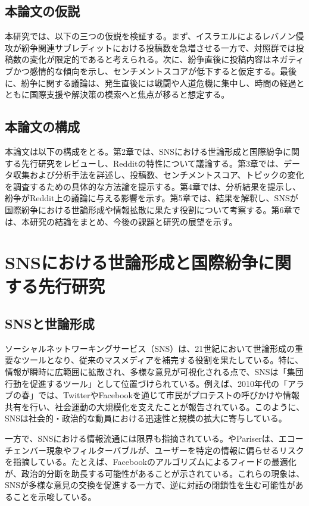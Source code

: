 \documentclass[11pt, a4j]{jreport}
\begin{document}
    \section{本論文の仮説}
    本研究では、以下の三つの仮説を検証する。まず、イスラエルによるレバノン侵攻が紛争関連サブレディットにおける投稿数を急増させる一方で、対照群では投稿数の変化が限定的であると考えられる。次に、紛争直後に投稿内容はネガティブかつ感情的な傾向を示し、センチメントスコアが低下すると仮定する。最後に、紛争に関する議論は、発生直後には戦闘や人道危機に集中し、時間の経過とともに国際支援や解決策の模索へと焦点が移ると想定する。
    
    \section{本論文の構成}
    本論文は以下の構成をとる。第2章では、SNSにおける世論形成と国際紛争に関する先行研究をレビューし、Redditの特性について議論する。第3章では、データ収集および分析手法を詳述し、投稿数、センチメントスコア、トピックの変化を調査するための具体的な方法論を提示する。第4章では、分析結果を提示し、紛争がReddit上の議論に与える影響を示す。第5章では、結果を解釈し、SNSが国際紛争における世論形成や情報拡散に果たす役割について考察する。第6章では、本研究の結論をまとめ、今後の課題と研究の展望を示す。

    \chapter{SNSにおける世論形成と国際紛争に関する先行研究}

    \section{SNSと世論形成}
    ソーシャルネットワーキングサービス（SNS）は、21世紀において世論形成の重要なツールとなり、従来のマスメディアを補完する役割を果たしている。特に、情報が瞬時に広範囲に拡散され、多様な意見が可視化される点で、SNSは「集団行動を促進するツール」として位置づけられている\citep{shrinky2011}。例えば、2010年代の「アラブの春」では、TwitterやFacebookを通じて市民がプロテストの呼びかけや情報共有を行い、社会運動の大規模化を支えたことが報告されている\citep{howard-hussain2013}。このように、SNSは社会的・政治的な動員における迅速性と規模の拡大に寄与している。

    一方で、SNSにおける情報流通には限界も指摘されている。\citet{ulen2001democracy}やPariser\citet{pariser2011filter}は、エコーチェンバー現象やフィルターバブルが、ユーザーを特定の情報に偏らせるリスクを指摘している。たとえば、Facebookのアルゴリズムによるフィードの最適化が、政治的分断を助長する可能性があることが示されている。これらの現象は、SNSが多様な意見の交換を促進する一方で、逆に対話の閉鎖性を生む可能性があることを示唆している。
\end{document}
